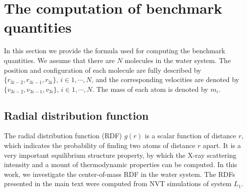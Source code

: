 \documentclass[a4paper,preprint,unsortedaddress,onecolumn,fleqn]{revtex4}
\begin{document}
\section{The computation of benchmark quantities}

\label{appendix:benchmark}

In this section we provide the formula used for computing the benchmark
quantities. We assume that there are $N$ molecules in the water system. The
position and configuration of each molecule are fully described by $\{%
\mathbf{\mathit{r}}_{3i-2},\mathbf{\mathit{r}}_{3i-1},\mathbf{\mathit{r}}%
_{3i}\},\,i\in 1,\cdots ,N$, and the corresponding velocities are denoted by 
$\{\mathbf{\mathit{v}}_{3i-2},\mathbf{\mathit{v}}_{3i-1},\mathbf{\mathit{v}}%
_{3i}\},\,i\in 1,\cdots ,N$. The mass of each atom is denoted by $m_{i}$.

\subsection{Radial distribution function}

The radial distribution function (RDF) $g(r)$ is a scalar function of
distance $r$, which indicates the probability of finding two atoms of
distance $r$ apart. It is a very important equilibrium structure property,
by which the X-ray scattering intensity and a mount of thermodynamic
properties can be computed. In this work, we investigate the center-of-mass
RDF in the water system. The RDFs presented in the main text were computed
from NVT simulations of system $L_1$.

\end{document}
